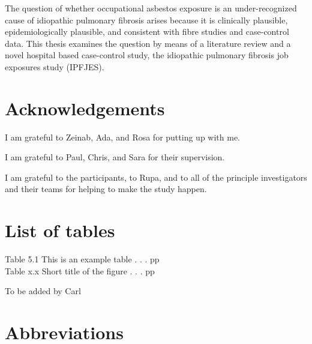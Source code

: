 \documentclass[
]{article}
\begin{document}
The question of whether occupational asbestos exposure is an
under-recognized cause of idiopathic pulmonary fibrosis arises because
it is clinically plausible, epidemiologically plausible, and consistent
with fibre studies and case-control data. This thesis examines the
question by means of a literature review and a novel hospital based
case-control study, the idiopathic pulmonary fibrosis job exposures
study (IPFJES).

\hypertarget{acknowledgements}{%
\section*{Acknowledgements}\label{acknowledgements}}

I am grateful to Zeinab, Ada, and Rosa for putting up with me.

I am grateful to Paul, Chris, and Sara for their supervision.

I am grateful to the participants, to Rupa, and to all of the principle
investigators and their teams for helping to make the study happen.

\newpage

\tableofcontents

\newpage

\hypertarget{section}{%
\section*{}\label{section}}

\listoffigures

\setcounter{page}{3}

\newpage

\hypertarget{list-of-tables}{%
\section*{List of tables}\label{list-of-tables}}

Table 5.1 This is an example table . . . \hfill{pp}\\
Table x.x Short title of the figure . . . \hfill{pp}

To be added by Carl

\hypertarget{abbreviations}{%
\section*{Abbreviations}\label{abbreviations}}
\end{document}
